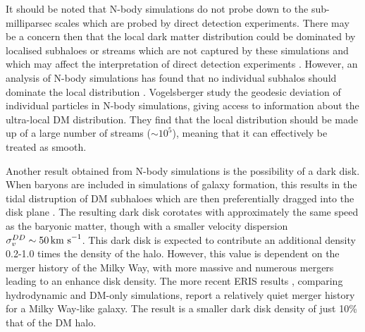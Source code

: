  It should be noted that N-body simulations do not probe down to the sub-milliparsec scales which are probed by direct detection experiments. There may be a concern then that the local dark matter distribution could be dominated by localised subhaloes or streams which are not captured by these simulations and which may affect the interpretation of direct detection experiments \cite{Freese:2004}. However, an analysis of N-body simulations has found that no individual subhalos should dominate the local distribution \cite{Helmi:2002}. Vogelsberger \etal \cite{Vogelsberger:2007} study the geodesic deviation of individual particles in N-body simulations, giving access to information about the ultra-local DM distribution. They find that the local distribution should be made up of a large number of streams ($\sim 10^5$), meaning that it can effectively be treated as smooth.


Another result obtained from N-body simulations is the possibility of a dark disk. When baryons are included in simulations of galaxy formation, this results in the tidal distruption of DM subhaloes which are then preferentially dragged into the disk plane \cite{Read:2009, Read:2010}. The resulting dark disk corotates with approximately the same speed as the baryonic matter, though with a smaller velocity dispersion $\sigma_v^{DD} \sim 50 \,\textrm{km s}^{-1}$. This dark disk is expected to contribute an additional density 0.2-1.0 times the density of the halo. However, this value is dependent on the merger history of the Milky Way, with more massive and numerous mergers leading to an enhance disk density. The more recent ERIS results \cite{Pillepich:2014}, comparing hydrodynamic and DM-only simulations, report a relatively quiet merger history for a Milky Way-like galaxy. The result is a smaller dark disk density of just 10\% that of the DM halo.

